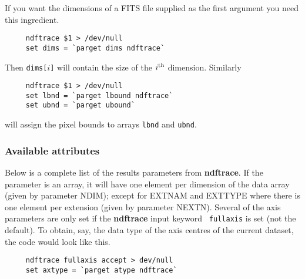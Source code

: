 \documentclass[twoside,11pt]{article}
\newcommand{\htmlref}[2]{#1}
\newcommand{\xref}[3]{#1}
\newcommand{\xlabel}[1]{}
\begin{document}
If you want the dimensions of a \htmlref{{\sf FITS}}{sc4_gl_fits} file
supplied as the first argument you need this ingredient.

\small
\begin{verbatim}
     ndftrace $1 > /dev/null
     set dims = `parget dims ndftrace`
\end{verbatim}
\normalsize
Then {\tt dims[$i$]} will contain the size of the $i^{\rm th}$
dimension.  Similarly

\small
\begin{verbatim}
     ndftrace $1 > /dev/null
     set lbnd = `parget lbound ndftrace`
     set ubnd = `parget ubound`
\end{verbatim}
\normalsize
will assign the pixel bounds to arrays {\tt lbnd} and {\tt ubnd}.

\subsubsection{\xlabel{sc4_se_dataset_atlist}Available attributes
\label{sc4_se_dataset_atlist}}

Below is a complete list of the results parameters from
\xref{{\bf ndftrace}}{sun95}{NDFTRACE}.  If the parameter is an array,
it will have one element per dimension of the data array (given by
parameter NDIM); except for EXTNAM and EXTTYPE where there is one
element per extension (given by parameter NEXTN). Several of the axis
parameters are only set if the {\bf ndftrace} input keyword {\tt
fullaxis} is set (not the default).  To obtain, say, the data type of
the axis centres of the current dataset, the code would look like
this.

\small
\begin{verbatim}
     ndftrace fullaxis accept > dev/null
     set axtype = `parget atype ndftrace`
\end{verbatim}
\normalsize
\end{document}
